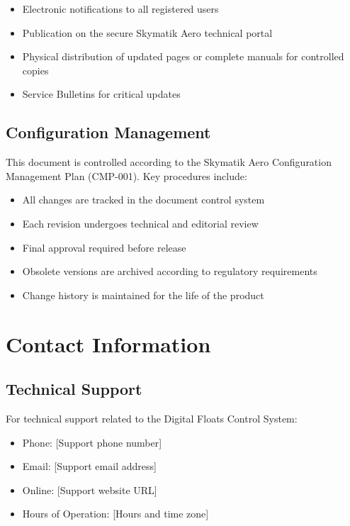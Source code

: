 \documentclass[12pt,a4paper,twoside,openright]{book}
\begin{document}
\begin{itemize}
    \item Electronic notifications to all registered users
    \item Publication on the secure Skymatik Aero technical portal
    \item Physical distribution of updated pages or complete manuals for controlled copies
    \item Service Bulletins for critical updates
\end{itemize}

\subsection{Configuration Management}

This document is controlled according to the Skymatik Aero Configuration Management Plan (CMP-001). Key procedures include:

\begin{itemize}
    \item All changes are tracked in the document control system
    \item Each revision undergoes technical and editorial review
    \item Final approval required before release
    \item Obsolete versions are archived according to regulatory requirements
    \item Change history is maintained for the life of the product
\end{itemize}

\section{Contact Information}

\subsection{Technical Support}

For technical support related to the Digital Floats Control System:

\begin{itemize}
    \item Phone: {\color{missingred}[Support phone number]}
    \item Email: {\color{missingred}[Support email address]}
    \item Online: {\color{missingred}[Support website URL]}
    \item Hours of Operation: {\color{missingred}[Hours and time zone]}
\end{itemize}
\end{document}
